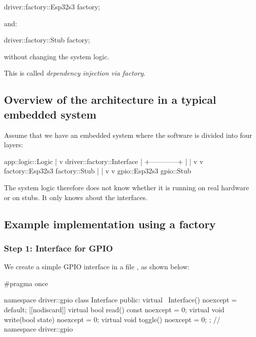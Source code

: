 \begin{cppcode}
driver::factory::Esp32s3 factory{};
\end{cppcode}

\noindent and:

\begin{cppcode}
driver::factory::Stub factory{};
\end{cppcode}

\noindent without changing the system logic.

This is called \emph{dependency injection via factory}.

\subsection{Overview of the architecture in a typical embedded system}
\label{c4:sec:architecture}
Assume that we have an embedded system where the software is divided into four layers:

\begin{console}
app::logic::Logic
        |
        v
driver::factory::Interface
        |
        +------------+
        |            |
        v            v
factory::Esp32s3   factory::Stub
        |            |
        v            v
gpio::Esp32s3      gpio::Stub
\end{console}

\noindent The system logic therefore does not know whether it is running on real hardware or on
stubs. It only knows about the interfaces.

\subsection{Example implementation using a factory}
\label{c4:sec:rawexample}

\subsubsection{Step 1: Interface for GPIO}
We create a simple GPIO interface in a file , as shown below:

\begin{cppcode}
#pragma once

namespace driver::gpio
{
class Interface
{
public:
    virtual ~Interface() noexcept = default;
    [[nodiscard]] virtual bool read() const noexcept = 0;
    virtual void write(bool state) noexcept = 0;
    virtual void toggle() noexcept = 0;
};
} // namespace driver::gpio
\end{cppcode}

